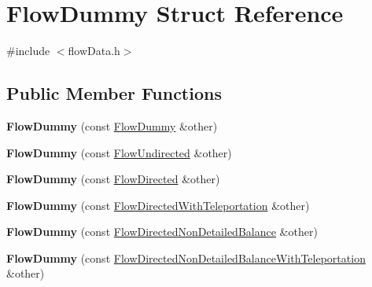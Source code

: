 \hypertarget{structFlowDummy}{}\section{Flow\+Dummy Struct Reference}
\label{structFlowDummy}


{\ttfamily \#include $<$flow\+Data.\+h$>$}

\subsection*{Public Member Functions}
\begin{DoxyCompactItemize}
\item 
\mbox{\label{structFlowDummy_a5ac25b31cf0badcf838843b91698883e}} 
{\bfseries Flow\+Dummy} (const \mbox{\hyperlink{structFlowDummy}{Flow\+Dummy}} \&other)
\item 
\mbox{\label{structFlowDummy_a8e461ed25ebbd4ac1af6bb1ff7768f97}} 
{\bfseries Flow\+Dummy} (const \mbox{\hyperlink{structFlowUndirected}{Flow\+Undirected}} \&other)
\item 
\mbox{\label{structFlowDummy_ae739b495604b9669c987c46376795fb3}} 
{\bfseries Flow\+Dummy} (const \mbox{\hyperlink{structFlowDirected}{Flow\+Directed}} \&other)
\item 
\mbox{\label{structFlowDummy_a7873e748454d6efc328b5d908e6e552f}} 
{\bfseries Flow\+Dummy} (const \mbox{\hyperlink{structFlowDirectedWithTeleportation}{Flow\+Directed\+With\+Teleportation}} \&other)
\item 
\mbox{\label{structFlowDummy_a007b72fa55efed27e720e979eb4577ab}} 
{\bfseries Flow\+Dummy} (const \mbox{\hyperlink{structFlowDirectedNonDetailedBalance}{Flow\+Directed\+Non\+Detailed\+Balance}} \&other)
\item 
\mbox{\label{structFlowDummy_a5546a10663ccac27f51a4ad6130a9844}} 
{\bfseries Flow\+Dummy} (const \mbox{\hyperlink{structFlowDirectedNonDetailedBalanceWithTeleportation}{Flow\+Directed\+Non\+Detailed\+Balance\+With\+Teleportation}} \&other)
\item 
\mbox{\label{structFlowDummy_a561d47a5b1bd5702f57ed27df715d536}} 

\end{DoxyCompactItemize}

